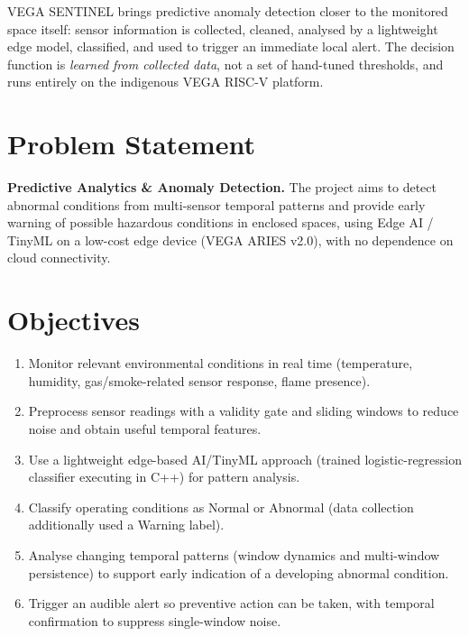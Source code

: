 \documentclass[11pt]{article}
\begin{document}
VEGA SENTINEL brings predictive anomaly detection closer to the
monitored space itself: sensor information is collected, cleaned,
analysed by a lightweight edge model, classified, and used to trigger an
immediate local alert. The decision function is \emph{learned from
collected data}, not a set of hand-tuned thresholds, and runs entirely
on the indigenous VEGA RISC-V platform.

\section{Problem Statement}
\textbf{Predictive Analytics \& Anomaly Detection.}
The project aims to detect abnormal conditions from multi-sensor
temporal patterns and provide early warning of possible hazardous
conditions in enclosed spaces, using Edge AI / TinyML on a low-cost
edge device (VEGA ARIES v2.0), with no dependence on cloud
connectivity.

\section{Objectives}
\begin{enumerate}[nosep]
  \item Monitor relevant environmental conditions in real time
        (temperature, humidity, gas/smoke-related sensor response,
        flame presence).
  \item Preprocess sensor readings with a validity gate and sliding
        windows to reduce noise and obtain useful temporal features.
  \item Use a lightweight edge-based AI/TinyML approach (trained
        logistic-regression classifier executing in C++) for pattern
        analysis.
  \item Classify operating conditions as Normal or Abnormal
        (data collection additionally used a Warning label).
  \item Analyse changing temporal patterns (window dynamics and
        multi-window persistence) to support early indication of a
        developing abnormal condition.
  \item Trigger an audible alert so preventive action can be taken,
        with temporal confirmation to suppress single-window noise.
\end{enumerate}
\end{document}
